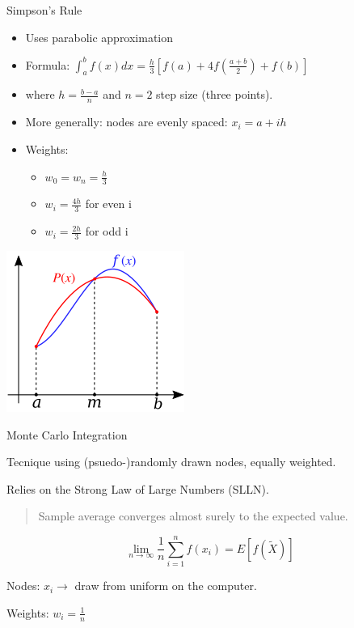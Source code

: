 \documentclass[notes,11pt, aspectratio=169]{beamer}
\newenvironment{wideitemize}{\itemize\addtolength{\itemsep}{10pt}}{\enditemize}
\begin{document}
\begin{frame}{Simpson's Rule}
    \begin{itemize}
    \item Uses parabolic approximation
    \item Formula: $\int_a^b f(x)dx = \frac{h}{3}[f(a) + 4f(\frac{a+b}{2}) + f(b)]$
    \item where $h=\frac{b-a}{n}$ and $n=2$ step size (three points). 
    \item More generally: nodes are evenly spaced: $x_i = a + ih$
    \item Weights:
    \begin{itemize}
    \item $w_0 = w_n = \frac{h}{3}$
    \item $w_i = \frac{4h}{3}$ for even i
    \item $w_i = \frac{2h}{3}$ for odd i
    \end{itemize}
    \end{itemize}

    \begin{center}

        \includegraphics[scale=0.45]{Simpsons_method_illustration.svg.png}

    \end{center}
\end{frame}


\begin{frame}{Monte Carlo Integration}
\begin{wideitemize}
    \item Tecnique using (psuedo-)randomly drawn nodes, equally weighted.
\item Relies on the Strong Law of Large Numbers (SLLN).
\begin{quote}
    Sample average converges almost surely to the expected value.
\end{quote}
    \[ \lim_{n\to\infty} \frac{1}{n}\sum_{i=1}^n f(x_i) = E[f(\tilde{X})] \]
\item Nodes: $x_i \rightarrow$ draw from uniform on the computer.
\item Weights: $w_i = \frac{1}{n}$
\end{wideitemize}
\end{frame}
\end{document}

